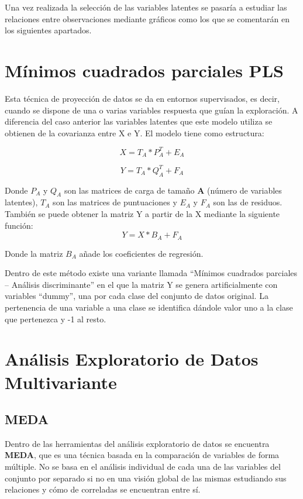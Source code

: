 Una vez realizada la selección de las variables latentes se pasaría a estudiar las relaciones entre observaciones mediante gráficos como los que se comentarán en los siguientes apartados.
\bigskip


\section{Mínimos cuadrados parciales PLS}
Esta técnica de proyección de datos se da en entornos supervisados, es decir, cuando se dispone de una o varias variables respuesta que guían la exploración. A diferencia del caso anterior las variables latentes que este modelo utiliza se obtienen de la covarianza entre X e Y. El modelo tiene como estructura:

\begin{equation}
X= T_A*P_A^T+E_A
\end{equation}

\begin{equation}
Y= T_A*Q_A^T+F_A
\end{equation}

Donde \textbf{$P_A$}  y \textbf{$Q_A$} son las matrices de carga de tamaño \textbf{A} (número de variables latentes), \textbf{$T_A$} son las matrices de puntuaciones y \textbf{$E_A$} y \textbf{$F_A$} son las de residuos.
\bigskip
También se puede obtener la matriz Y a partir de la X mediante la siguiente función:
\begin{equation}
Y=X*B_A+F_A
\end{equation}


Donde la matriz \textbf{$B_A$} añade los coeficientes de regresión.

\bigskip
Dentro de este método existe una variante  llamada “Mínimos cuadrados parciales – Análisis discriminante” en el que la matriz Y se genera artificialmente con variables “dummy”, una por cada clase del conjunto de datos original. La pertenencia de una variable a una clase se identifica dándole valor uno a la clase que pertenezca y -1 al resto.

\bigskip

\section{Análisis Exploratorio de Datos Multivariante}
\subsection{MEDA}
Dentro de las herramientas del análisis exploratorio de datos se encuentra \textbf{MEDA}, que es una técnica basada en la comparación de variables de forma múltiple. No se basa en el análisis individual de cada una de las variables del conjunto por separado si no en una visión global de las mismas estudiando sus relaciones y cómo de correladas se encuentran entre sí.
\bigskip

